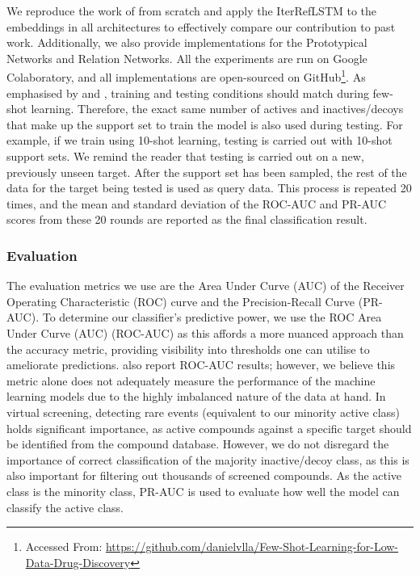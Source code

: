 We reproduce the work of \citet{altae2017low} from scratch and apply the IterRefLSTM to the embeddings in all architectures to effectively compare our contribution to past work. Additionally, we also provide implementations for the Prototypical Networks and Relation Networks. All the experiments are run on Google Colaboratory, and all implementations are open-sourced on GitHub\footnote{Accessed From: \url{https://github.com/danielvlla/Few-Shot-Learning-for-Low-Data-Drug-Discovery}}. As emphasised by \citet{vinyals2016matching} and \citet{snell2017prototypical}, training and testing conditions should match during few-shot learning. Therefore, the exact same number of actives and inactives/decoys that make up the support set to train the model is also used during testing. For example, if we train using 10-shot learning, testing is carried out with 10-shot support sets. We remind the reader that testing is carried out on a new, previously unseen target. After the support set has been sampled, the rest of the data for the target being tested is used as query data. This process is repeated 20 times, and the mean and standard deviation of the ROC-AUC and PR-AUC scores from these 20 rounds are reported as the final classification result.

\subsubsection{Evaluation}

The evaluation metrics we use are the Area Under Curve (AUC) of the Receiver Operating Characteristic (ROC) curve and the Precision-Recall Curve (PR-AUC). To determine our classifier's predictive power, we use the ROC Area Under Curve (AUC) (ROC-AUC) as this affords a more nuanced approach than the accuracy metric, providing visibility into thresholds one can utilise to ameliorate predictions. \citet{altae2017low} also report ROC-AUC results; however, we believe this metric alone does not adequately measure the performance of the machine learning models due to the highly imbalanced nature of the data at hand. In virtual screening, detecting rare events (equivalent to our minority active class) holds significant importance, as active compounds against a specific target should be identified from the compound database. However, we do not disregard the importance of correct classification of the majority inactive/decoy class, as this is also important for filtering out thousands of screened compounds. As the active class is the minority class, PR-AUC is used to evaluate how well the model can classify the active class.

